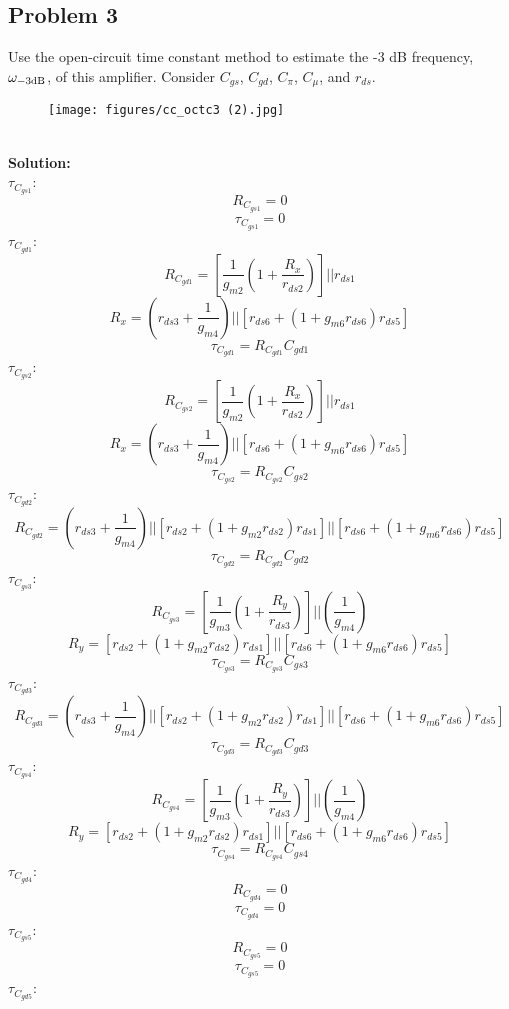 \documentclass{article}
\begin{document}
\subsection*{Problem 3}
Use the open-circuit time constant method to estimate the -3 dB frequency, $\omega_{\rm -3 dB}$, of this amplifier.  Consider $C_{gs}$, $C_{gd}$, $C_{\pi}$, $C_{\mu}$, and $r_{ds}$. 
\begin{figure}[!h]
\begin{center}
    \texttt{[image: figures/cc\_octc3 (2).jpg]}

\end{center}
\end{figure} \\
\textbf{Solution:} \\
$\tau_{C_{gs1}}$:
$$R_{C_{gs1}} = 0$$
$$\boxed{\tau_{C_{gs1}} = 0}$$
$\tau_{C_{gd1}}$:
$$R_{C_{gd1}} = \left[\frac{1}{g_{m2}}\left(1 + \frac{R_x}{r_{ds2}}\right)\right]||r_{ds1}$$
$$R_x = \left(r_{ds3} + \frac{1}{g_{m4}}\right) || \left[r_{ds6} + (1 + g_{m6}r_{ds6})r_{ds5}\right]$$
$$\boxed{\tau_{C_{gd1}} = R_{C_{gd1}}C_{gd1}}$$
$\tau_{C_{gs2}}$:
$$R_{C_{gs2}} = \left[\frac{1}{g_{m2}}\left(1 + \frac{R_x}{r_{ds2}}\right)\right]||r_{ds1}$$
$$R_x = \left(r_{ds3} + \frac{1}{g_{m4}}\right) || \left[r_{ds6} + (1 + g_{m6}r_{ds6})r_{ds5}\right]$$
$$\boxed{\tau_{C_{gs2}} = R_{C_{gs2}}C_{gs2}}$$
$\tau_{C_{gd2}}$:
$$R_{C_{gd2}} =  \left(r_{ds3} + \frac{1}{g_{m4}}\right) || \left[r_{ds2} + (1 + g_{m2}r_{ds2})r_{ds1}\right] || \left[r_{ds6} + (1 + g_{m6}r_{ds6})r_{ds5}\right]$$
$$\boxed{\tau_{C_{gd2}} = R_{C_{gd2}}C_{gd2}}$$
$\tau_{C_{gs3}}$:
$$R_{C_{gs3}} = \left[\frac{1}{g_{m3}}\left(1 + \frac{R_y}{r_{ds3}}\right)\right]||\left(\frac{1}{g_{m4}}\right)$$
$$R_y = \left[r_{ds2} + (1 + g_{m2}r_{ds2})r_{ds1}\right] || \left[r_{ds6} + (1 + g_{m6}r_{ds6})r_{ds5}\right]$$
$$\boxed{\tau_{C_{gs3}} = R_{C_{gs3}}C_{gs3}}$$
$\tau_{C_{gd3}}$:
$$R_{C_{gd3}} =  \left(r_{ds3} + \frac{1}{g_{m4}}\right) || \left[r_{ds2} + (1 + g_{m2}r_{ds2})r_{ds1}\right] || \left[r_{ds6} + (1 + g_{m6}r_{ds6})r_{ds5}\right]$$
$$\boxed{\tau_{C_{gd3}} = R_{C_{gd3}}C_{gd3}}$$
$\tau_{C_{gs4}}$:
$$R_{C_{gs4}} = \left[\frac{1}{g_{m3}}\left(1 + \frac{R_y}{r_{ds3}}\right)\right]||\left(\frac{1}{g_{m4}}\right)$$
$$R_y = \left[r_{ds2} + (1 + g_{m2}r_{ds2})r_{ds1}\right] || \left[r_{ds6} + (1 + g_{m6}r_{ds6})r_{ds5}\right]$$
$$\boxed{\tau_{C_{gs4}} = R_{C_{gs4}}C_{gs4}}$$
$\tau_{C_{gd4}}$:
$$R_{C_{gd4}} = 0$$
$$\boxed{\tau_{C_{gd4}} = 0}$$
$\tau_{C_{gs5}}$:
$$R_{C_{gs5}} = 0$$
$$\boxed{\tau_{C_{gs5}} = 0}$$
$\tau_{C_{gd5}}$:
\end{document}
